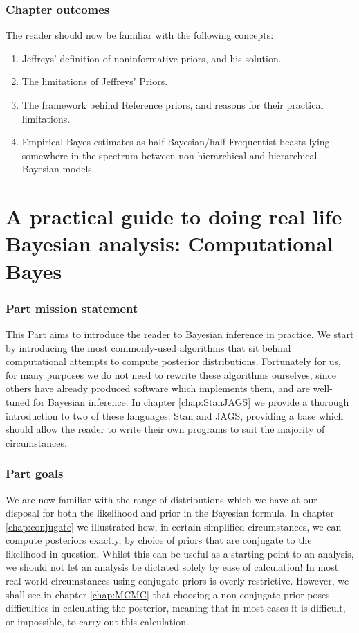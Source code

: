\documentclass[11pt,fullpage]{book}
\begin{document}
\section{Chapter outcomes}
The reader should now be familiar with the following concepts:

\begin{enumerate}
\item Jeffreys' definition of noninformative priors, and his solution.
\item The limitations of Jeffreys' Priors.
\item The framework behind Reference priors, and reasons for their practical limitations.
\item Empirical Bayes estimates as half-Bayesian/half-Frequentist beasts lying somewhere in the spectrum between non-hierarchical and hierarchical Bayesian models.
\end{enumerate}


\part{A practical guide to doing real life Bayesian analysis: Computational Bayes}\label{part:computationalBayes}
\section{Part mission statement}
This Part aims to introduce the reader to Bayesian inference in practice. We start by introducing the most commonly-used algorithms that sit behind computational attempts to compute posterior distributions. Fortunately for us, for many purposes we do not need to rewrite these algorithms ourselves, since others have already produced software which implements them, and are well-tuned for Bayesian inference. In chapter \ref{chap:StanJAGS} we provide a thorough introduction to two of these languages: Stan and JAGS, providing a base which should allow the reader to write their own programs to suit the majority of circumstances.

\section{Part goals}
We are now familiar with the range of distributions which we have at our disposal for both the likelihood and prior in the Bayesian formula. In chapter \ref{chap:conjugate} we illustrated how, in certain simplified circumstances, we can compute posteriors exactly, by choice of priors that are conjugate to the likelihood in question. Whilst this can be useful as a starting point to an analysis, we should not let an analysis be dictated solely by ease of calculation! In most real-world circumstances using conjugate priors is overly-restrictive. However, we shall see in chapter \ref{chap:MCMC} that choosing a non-conjugate prior poses difficulties in calculating the posterior, meaning that in most cases it is difficult, or impossible, to carry out this calculation. 
\end{document}
